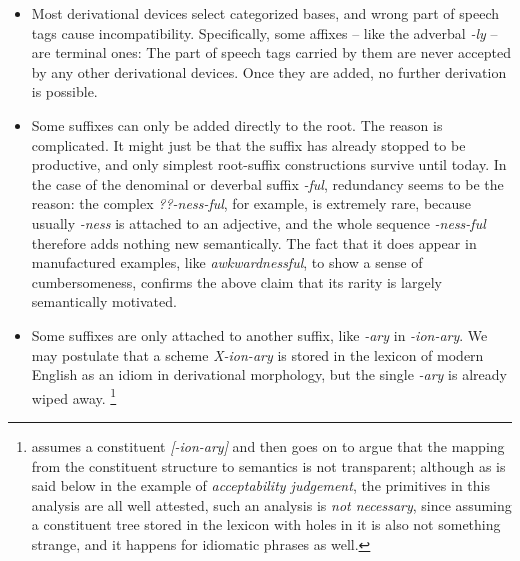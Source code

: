 \documentclass[UTF8, a4paper, oneside, scheme=plain, 12pt]{ctexbook}
\newcommand{\form}[1]{\emph{#1}}
\begin{document}
\begin{itemize}
    \item Most derivational devices select categorized bases,
    and wrong part of speech tags cause incompatibility.
    Specifically, some affixes -- like the adverbal \form{-ly} -- are terminal ones:
    The part of speech tags carried by them are never accepted by any other derivational devices.
    Once they are added,
    no further derivation is possible. %

    \item Some suffixes can only be added directly to the root.
    The reason is complicated.
    It might just be that the suffix has already stopped to be productive,
    and only simplest root-suffix constructions survive until today.
    In the case of the denominal or deverbal suffix \form{-ful},
    redundancy seems to be the reason:
    the complex \form{??-ness-ful},
    for example, is extremely rare,
    because usually \form{-ness} is attached to an adjective,
    and the whole sequence \form{-ness-ful} therefore adds nothing new semantically.
    The fact that it does appear in manufactured examples, like \form{awkwardnessful},
    to show a sense of cumbersomeness,
    confirms the above claim that its rarity is largely semantically motivated.

    \item Some suffixes are only attached to another suffix, 
    like \form{-ary} in \form{-ion-ary}.
    We may postulate that a scheme \form{X-ion-ary} is stored in the 
    lexicon of modern English as an idiom in derivational morphology,
    but the single \form{-ary} is already wiped away.%
    \footnote{
        \citet{fabb1988english} assumes a constituent \form{[-ion-ary]}
        and then goes on to argue that the mapping from the constituent structure 
        to semantics is not transparent;
        although as is said below in the example of 
        \form{acceptability judgement}, 
        the primitives in this analysis are all well attested,
        such an analysis is \emph{not necessary},
        since assuming a constituent tree stored in the lexicon 
        with holes in it
        is also not something strange,
        and it happens for idiomatic phrases as well.
    }


\end{itemize}
\end{document}
